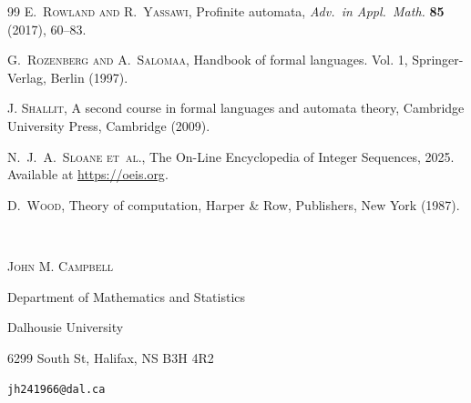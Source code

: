 \documentclass[12pt]{article}
\begin{document}
\begin{thebibliography}{99}
 \textsc{E.\ Rowland and R.\ Yassawi}, 
 Profinite automata, 
 \emph{Adv.\ in Appl.\ Math.} {\bf 85} (2017), 60--83. 

 \textsc{G.\ Rozenberg and A.\ Salomaa}, 
 Handbook of formal languages. {V}ol. 1, 
 Springer-Verlag, Berlin (1997). 

 \textsc{J. Shallit}, 
 A second course in formal languages and automata theory, 
 Cambridge University Press, Cambridge (2009). 

 \textsc{N.\ J.\ A.\ Sloane et~al.}, 
 The {O}n-{L}ine {E}ncyclopedia of {I}nteger {S}equences, 2025. 
 Available at \url{https://oeis.org}. 

 \textsc{D.\ Wood}, 
 Theory of computation, 
 Harper \& Row, Publishers, New York (1987). 

\end{thebibliography}

 \ 

{\textsc{John M. Campbell}} 

\vspace{0.1in}

Department of Mathematics and Statistics

Dalhousie University

6299 South St, Halifax, NS B3H 4R2

\vspace{0.1in}

{\tt jh241966@dal.ca}

 
\end{document}
